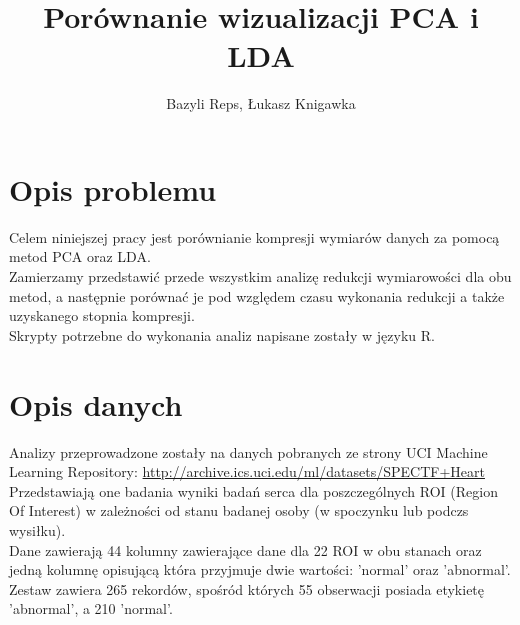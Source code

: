 \documentclass[10pt,a4paper]{article}
\begin{document}
\title{Porównanie wizualizacji PCA i LDA}
\author{Bazyli Reps, Łukasz Knigawka}
\maketitle
\tableofcontents

\newpage

\section{Opis problemu}
Celem niniejszej pracy jest porównianie kompresji wymiarów danych za pomocą metod PCA oraz LDA. 
\\
Zamierzamy przedstawić przede wszystkim analizę redukcji wymiarowości dla obu metod, a następnie porównać je pod względem czasu wykonania redukcji a także uzyskanego stopnia kompresji. 
\\
Skrypty potrzebne do wykonania analiz napisane zostały w języku R.

\section{Opis danych}
Analizy przeprowadzone zostały na danych pobranych ze strony UCI Machine Learning Repository:
\url{http://archive.ics.uci.edu/ml/datasets/SPECTF+Heart}
\\
Przedstawiają one badania wyniki badań serca dla poszczególnych ROI (Region Of Interest) w zależności od stanu badanej osoby (w spoczynku lub podczs wysiłku).
\\
Dane zawierają 44 kolumny zawierające dane dla 22 ROI w obu stanach oraz jedną kolumnę opisującą która przyjmuje dwie wartości: 'normal' oraz 'abnormal'. Zestaw zawiera 265 rekordów,
spośród których 55 obserwacji posiada etykietę 'abnormal', a 210 'normal'. 

\newpage
\end{document}
